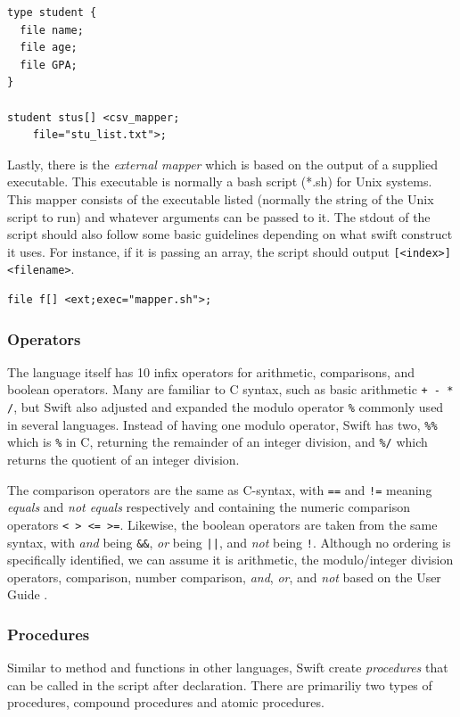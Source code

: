         \begin{lstlisting}
type student {
  file name;
  file age;
  file GPA;
}

student stus[] <csv_mapper;
    file="stu_list.txt">;
        \end{lstlisting}

    Lastly, there is the \textit{external mapper} which is based on the output of a supplied executable. This executable is normally a bash script (*.sh) for Unix systems. This mapper consists of the executable listed (normally the string of the Unix script to run) and whatever arguments can be passed to it. The stdout of the script should also follow some basic guidelines depending on what swift construct it uses. For instance, if it is passing an array, the script should output \texttt{[<index>] <filename>}.

    \begin{lstlisting}
file f[] <ext;exec="mapper.sh">;
    \end{lstlisting}

    \subsubsection{Operators}
        The language itself has 10 infix operators for arithmetic, comparisons, and boolean operators. Many are familiar to C syntax, such as basic arithmetic \texttt{+ - * /}, but Swift also adjusted and expanded the modulo operator \texttt{\%} commonly used in several languages. Instead of having one modulo operator, Swift has two, \texttt{\%\%} which is \texttt{\%} in C, returning the remainder of an integer division, and \texttt{\%/} which returns the quotient of an integer division.

        The comparison operators are the same as C-syntax, with \texttt{==} and \texttt{!=} meaning \textit{equals} and \textit{not equals} respectively and containing the numeric comparison operators \texttt{< > <= >=}. Likewise, the boolean operators are taken from the same syntax, with \textit{and} being \texttt{\&\&}, \textit{or} being \texttt{||}, and \textit{not} being \texttt{!}. Although no ordering is specifically identified, we can assume it is arithmetic, the modulo/integer division operators, comparison, number comparison, \textit{and}, \textit{or}, and \textit{not} based on the User Guide \cite{website:swift-lang-user-guide}.

    \subsubsection{Procedures}
        Similar to method and functions in other languages, Swift create \textit{procedures} that can be called in the script after declaration. There are primariliy two types of procedures, compound procedures and atomic procedures.

